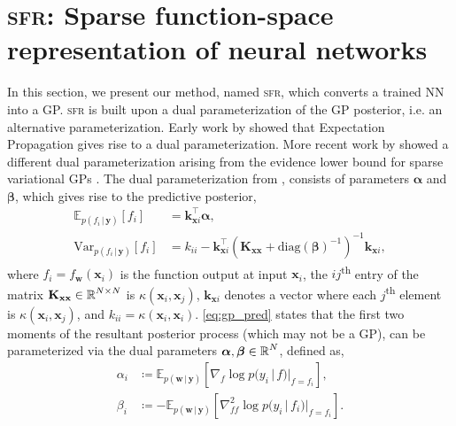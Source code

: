 \documentclass{article}
\renewcommand{\paragraph}[1]{{\bf #1}~~}
\newcommand{\our}{\textsc{sfr}\xspace}
\newcommand{\mathbold}[1]{\bm{#1}}
\newcommand{\mbf}[1]{\mathbf{#1}}
\renewcommand{\mid}{\,|\,}
\newcommand{\valpha}[0]{\mathbold{\alpha}}
\newcommand{\vbeta}[0]{\mathbold{\beta}}
\newcommand{\diag}{\text{{diag}}}
\newcommand{\vx}{\mbf{x}}
\newcommand{\vy}{\mbf{y}}
\newcommand{\vw}{\mbf{w}}
\newcommand{\MKxx}{\mbf{K}_{\mbf{x}\mbf{x}}}
\newcommand{\vk}{\mbf{k}}
\newcommand{\myexpect}{\mathbb{E}}
\begin{document}
\section{\our: Sparse function-space representation of neural networks}\label{sec:sfr}
In this section, we present our method, named \our, which converts a trained NN into a GP.
\our is built upon a dual parameterization of the GP posterior, i.e. an alternative parameterization.
Early work by \citet{csato2002sparse} showed that Expectation Propagation gives rise to a dual parameterization.
More recent work by \citet{adam2021dual,chang2023memory} showed a different dual parameterization arising from the evidence lower bound for sparse variational GPs \citep{hensman2013gaussian,titsias2009variational}.
The dual parameterization from \citet{adam2021dual,chang2023memory}, consists of parameters $\valpha$ and $\vbeta$, which gives rise to the predictive posterior,
\begin{subequations}  \label{eq:gp_pred}
\begin{align}
  \myexpect_{p(f_i \mid\vy)}[f_i] &= \vk_{\vx i}^\top \valpha, \\
  \mathrm{Var}_{p(f_i \mid \vy)}[f_i] &= k_{ii} - \vk_{\vx i}^\top ( \MKxx + \diag(\vbeta)^{-1})^{-1} \vk_{\vx i},  \nonumber
\end{align}
\end{subequations}
%
where $f_i = f_\vw(\vx_i)$ is the function output at input $\vx_i$,
the $ij$\textsuperscript{th} entry of the matrix $\MKxx \in \R^{N \times N}$ is $\kappa(\vx_i,\vx_j)$, $\vk_{\vx i}$ denotes a vector where each $j$\textsuperscript{th} element is $\kappa(\vx_i, \vx_j)$, and $k_{ii} = \kappa(\vx_i, \vx_i)$.
\cref{eq:gp_pred} states that the first two moments of the resultant posterior process (which may not be a GP), can be parameterized via the dual
parameters $\valpha, \vbeta \in \R^{N}$,
defined as, 
%
\begin{subequations}
\label{eq:dual_param}
\begin{align}
  \alpha_i &\coloneqq \myexpect_{p(\vw \mid \vy)}[\nabla_{f}\log p(y_i \mid f) |_{f=f_i}], \\
  \beta_i &\coloneqq - \myexpect_{p(\vw \mid \vy)}[\nabla^2_{f f}\log p(y_i \mid f_i) |_{f=f_i}].
  \end{align}
\end{subequations}
\end{document}
